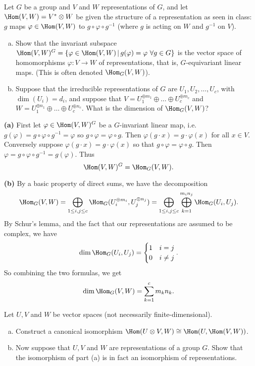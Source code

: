 \documentclass[11pt,letterpaper]{article}
\begin{document}
\pagebreak
\begin{problem}
    Let $G$ be a group and $V$ and $W$ representations of $G$, and let $\Hom(V,W) = V^* \otimes W$ be given the structure of a representation as seen in class: $g$ maps $\varphi\in \Hom(V,W)$ to $g\circ \varphi\circ g^{-1}$ (where $g$ is acting on $W$ and $g^{-1}$ on $V$).
    \begin{enumerate}[(a)]
        \item Show that the invariant subspace $\Hom(V,W)^G=\{\varphi\in \Hom(V,W)\,|\,g(\varphi)=\varphi\ \forall g\in G\}$ is the vector space of homomorphisms $\varphi : V \to W$ of representations, that is, $G$-equivariant linear maps. (This is often denoted $\Hom_G(V,W)$).
        \item Suppose that the irreducible representations of $G$ are $U_1, U_2, \dots, U_c$, with $\dim(U_i) = d_i$, and suppose that $V =  U_1^{\oplus m_1}\oplus\dots\oplus U_c^{\oplus m_c}$ and $W = U_1^{\oplus n_1}\oplus\dots\oplus U_c^{\oplus n_c}$.  What is the dimension of $\Hom_G(V,W)$?
    \end{enumerate}
\end{problem}

\textbf{(a)} First let $\varphi \in \Hom(V,W)^G$ be a $G$-invariant linear map, i.e. $g(\varphi)=g\circ \varphi\circ g^{-1}=\varphi$ so $g\circ \varphi = \varphi \circ g$. Then $\varphi(g\cdot x) = g\cdot \varphi(x)$ for all $x\in V$. Conversely suppose $\varphi(g\cdot x) = g\cdot \varphi(x)$ so that $g\circ\varphi=\varphi\circ g$. Then $\varphi=g\circ\varphi \circ g^{-1}=g(\varphi)$. Thus
\[
    \Hom(V,W)^G = \Hom_G(V,W)
.\] 

\textbf{(b)} By a basic property of direct sums, we have the decomposition
\[
    \Hom_G(V,W)=\bigoplus_{1\leq i,j\leq c}\Hom_G(U_i^{\oplus m_i}, U_j^{\oplus n_j})=\bigoplus_{1\leq i,j\leq c}\bigoplus_{k=1}^{m_in_j}\Hom_G(U_i, U_j)
.\] 
By Schur's lemma, and the fact that our representations are assumed to be complex, we have
\[
    \dim \Hom_G(U_i, U_j) = \begin{cases}1&i=j\\ 0&i\neq j\end{cases}
.\]     
So combining the two formulas, we get
\[
    \dim \Hom_G(V, W) = \sum_{k=1}^c m_kn_k
.\] 

\pagebreak
\begin{problem}
    Let $U, V$ and $W$ be vector spaces (not necessarily finite-dimensional).
    \begin{enumerate}[(a)]
        \item Construct a canonical isomorphism $\Hom(U \otimes V, W) \cong \Hom(U, \Hom(V,W))$.
        \item Now suppose that $U, V$ and $W$ are representations of a group $G$. Show that the isomorphism of part (a) is in fact an isomorphism of representations.
    \end{enumerate}
\end{problem}
\end{document}
